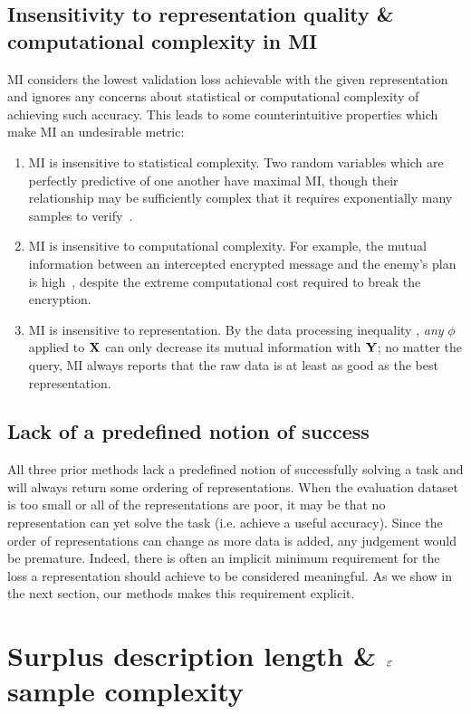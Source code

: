 \subsection{Insensitivity to representation quality  \& computational complexity in MI}
\label{sec:mutual_info}
MI considers the lowest validation loss achievable with the given representation and ignores any concerns about statistical or computational complexity of achieving such accuracy.
This leads to some counterintuitive properties which make MI an undesirable metric:
\begin{enumerate}
    \item MI is insensitive to statistical complexity. Two random variables which are perfectly predictive of one another have maximal MI, though their relationship may be sufficiently complex that it requires exponentially many samples to verify~\citep{McAllester2018FormalLO}.
    \item MI is insensitive to computational complexity. For example, the mutual information between an intercepted encrypted message and the enemy's plan is high~\citep{Shannon1948TheMT, Xu2020ATheory}, despite the extreme computational cost required to break the encryption.
    \item MI is insensitive to representation. By the data processing inequality \citep{Cover2006ElementsOI}, \emph{any} $\phi$ applied to ${\mathbf{X}}$ can only decrease its mutual information with ${\mathbf{Y}}$; no matter the query, MI always reports that the raw data is at least as good as the best representation.
\end{enumerate}


\subsection{Lack of a predefined notion of success}
All three prior methods lack a predefined notion of successfully solving a task and
will always return some ordering of representations.
When the evaluation dataset is too small or all of the representations are poor, it may be that no representation can yet solve the task (i.e. achieve a useful accuracy).
Since the order of representations can change as more data is added, any judgement would be premature.
Indeed, there is often an implicit minimum requirement for the loss a representation should achieve to be considered meaningful.
As we show in the next section, our methods makes this requirement explicit.



\section{Surplus description length \& $\varepsilon$ sample complexity}

